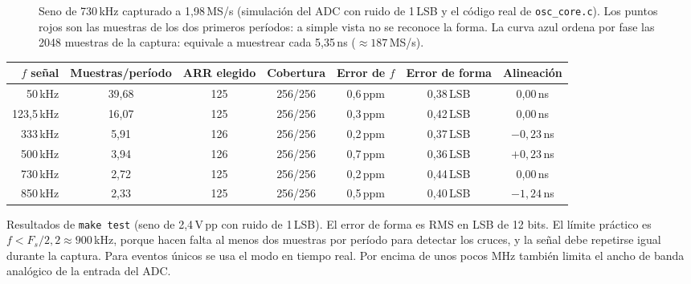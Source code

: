 \documentclass[11pt,a4paper]{article}
\begin{document}
\begin{figure}[h]
\centering
{}
\caption{Seno de 730\,kHz capturado a 1,98\,MS/s (simulación del ADC con ruido
de 1\,LSB y el código real de \texttt{osc\_core.c}). Los puntos rojos son las
muestras de los dos primeros períodos: a simple vista no se reconoce la forma.
La curva azul ordena por fase las 2048 muestras de la captura: equivale a
muestrear cada 5,35\,ns ($\approx 187$\,MS/s).}
\end{figure}

\begin{center}\small
\begin{tabular}{@{}rcccccc@{}}
\toprule
$f$ señal & Muestras/período & ARR elegido & Cobertura & Error de $f$ & Error de forma & Alineación \\
\midrule
50\,kHz  & 39,68 & 125 & 256/256 & 0,6\,ppm & 0,38\,LSB & 0,00\,ns \\
123,5\,kHz & 16,07 & 125 & 256/256 & 0,3\,ppm & 0,42\,LSB & 0,00\,ns \\
333\,kHz & 5,91 & 126 & 256/256 & 0,2\,ppm & 0,37\,LSB & $-0{,}23$\,ns \\
500\,kHz & 3,94 & 126 & 256/256 & 0,7\,ppm & 0,36\,LSB & $+0{,}23$\,ns \\
730\,kHz & 2,72 & 125 & 256/256 & 0,2\,ppm & 0,44\,LSB & 0,00\,ns \\
850\,kHz & 2,33 & 125 & 256/256 & 0,5\,ppm & 0,40\,LSB & $-1{,}24$\,ns \\
\bottomrule
\end{tabular}
\end{center}
Resultados de \texttt{make test} (seno de 2,4\,V\,pp con ruido de 1\,LSB). El
error de forma es RMS en LSB de 12 bits. El límite práctico es $f < F_s/2{,}2
\approx 900$\,kHz, porque hacen falta al menos dos muestras por período para
detectar los cruces, y la señal debe repetirse igual durante la captura. Para
eventos únicos se usa el modo en tiempo real. Por encima de unos pocos MHz
también limita el ancho de banda analógico de la entrada del ADC.
\end{document}
